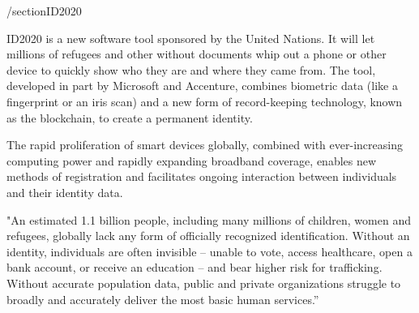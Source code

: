 /section{ID2020}

ID2020 is a new software tool sponsored by the United Nations. It will let millions of refugees and other without documents whip out a phone or other device to quickly show who they are and where they came from. The tool, developed in part by Microsoft and Accenture, combines biometric data (like a fingerprint or an iris scan) and a new form of record-keeping technology, known as the blockchain, to create a permanent identity.
 
The rapid proliferation of smart devices globally, combined with ever-increasing computing power and rapidly expanding broadband coverage, enables new methods of registration and facilitates ongoing interaction between individuals and their identity data. 
 
 "An estimated 1.1 billion people, including many millions of children, women and refugees, globally lack any form of officially recognized identification. Without an identity, individuals are often invisible – unable to vote, access healthcare, open a bank account, or receive an education – and bear higher risk for trafficking. Without accurate population data, public and private organizations struggle to broadly and accurately deliver the most basic human services.”  \cite{hid-sp18-506-NoID} 
